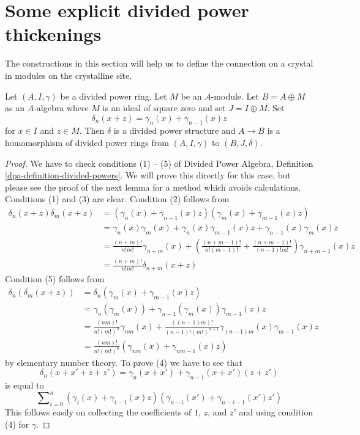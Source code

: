 \section{Some explicit divided power thickenings}
\label{section-explicit-thickenings}

\noindent
The constructions in this section will help us to define the connection
on a crystal in modules on the crystalline site.

\begin{lemma}
\label{lemma-divided-power-first-order-thickening}
Let $(A, I, \gamma)$ be a divided power ring. Let $M$ be an $A$-module.
Let $B = A \oplus M$ as an $A$-algebra where $M$ is an ideal of square zero
and set $J = I \oplus M$. Set
$$
\delta_n(x + z) = \gamma_n(x) + \gamma_{n - 1}(x)z
$$
for $x \in I$ and $z \in M$.
Then $\delta$ is a divided power structure and
$A \to B$ is a homomorphism of divided power rings from
$(A, I, \gamma)$ to $(B, J, \delta)$.
\end{lemma}

\begin{proof}
We have to check conditions (1) -- (5) of
Divided Power Algebra, Definition \ref{dpa-definition-divided-powers}.
We will prove this directly for this case, but please see the proof of
the next lemma for a method which avoids calculations.
Conditions (1) and (3) are clear. Condition (2) follows from
\begin{align*}
\delta_n(x + z)\delta_m(x + z)
& =
(\gamma_n(x) + \gamma_{n - 1}(x)z)(\gamma_m(x) + \gamma_{m - 1}(x)z) \\
& = \gamma_n(x)\gamma_m(x) + \gamma_n(x)\gamma_{m - 1}(x)z +
\gamma_{n - 1}(x)\gamma_m(x)z \\
& =
\frac{(n + m)!}{n!m!} \gamma_{n + m}(x) +
\left(\frac{(n + m - 1)!}{n!(m - 1)!} +
\frac{(n + m - 1)!}{(n - 1)!m!}\right)
\gamma_{n + m - 1}(x) z \\
& =
\frac{(n + m)!}{n!m!}\delta_{n + m}(x + z)
\end{align*}
Condition (5) follows from
\begin{align*}
\delta_n(\delta_m(x + z))
& =
\delta_n(\gamma_m(x) + \gamma_{m - 1}(x)z) \\
& =
\gamma_n(\gamma_m(x)) + \gamma_{n - 1}(\gamma_m(x))\gamma_{m - 1}(x)z \\
& =
\frac{(nm)!}{n! (m!)^n} \gamma_{nm}(x) +
\frac{((n - 1)m)!}{(n - 1)! (m!)^{n - 1}}
\gamma_{(n - 1)m}(x) \gamma_{m - 1}(x) z \\
& = \frac{(nm)!}{n! (m!)^n}(\gamma_{nm}(x) + \gamma_{nm - 1}(x) z)
\end{align*}
by elementary number theory. To prove (4) we have to see that
$$
\delta_n(x + x' + z + z')
=
\gamma_n(x + x') + \gamma_{n - 1}(x + x')(z + z')
$$
is equal to
$$
\sum\nolimits_{i = 0}^n
(\gamma_i(x) + \gamma_{i - 1}(x)z)
(\gamma_{n - i}(x') + \gamma_{n - i - 1}(x')z')
$$
This follows easily on collecting the coefficients of
$1$, $z$, and $z'$ and using condition (4) for $\gamma$.
\end{proof}

